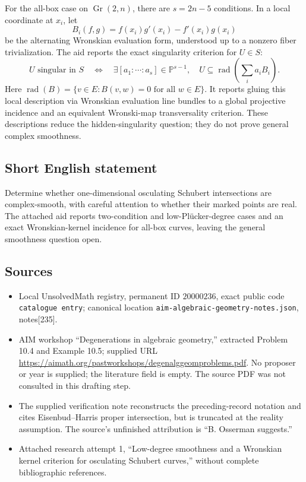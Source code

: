 \documentclass[11pt]{article}
\newcommand{\PP}{\mathbb{P}}
\begin{document}
For the all-box case on \(\operatorname{Gr}(2,n)\), there are \(s=2n-5\) conditions. In a local coordinate at \(x_i\), let
\[
B_i(f,g)=f(x_i)g'(x_i)-f'(x_i)g(x_i)
\]
be the alternating Wronskian evaluation form, understood up to a nonzero fiber trivialization. The aid reports the exact singularity criterion for \(U\in S\):
\[
U\text{ singular in }S
\quad\Longleftrightarrow\quad
\exists[a_1:\cdots:a_s]\in\PP^{s-1},\quad
U\subseteq\operatorname{rad}\!\left(\sum_i a_iB_i\right).
\]
Here \(\operatorname{rad}(B)=\{v\in E:B(v,w)=0\text{ for all }w\in E\}\). It reports gluing this local description via Wronskian evaluation line bundles to a global projective incidence and an equivalent Wronski-map transversality criterion. These descriptions reduce the hidden-singularity question; they do not prove general complex smoothness.
\subsection{Short English statement}
Determine whether one-dimensional osculating Schubert intersections are complex-smooth, with careful attention to whether their marked points are real. The attached aid reports two-condition and low-Pl\"ucker-degree cases and an exact Wronskian-kernel incidence for all-box curves, leaving the general smoothness question open.
\subsection{Sources}
\begin{itemize}
\item Local UnsolvedMath registry, permanent ID \(20000236\), exact public code \texttt{catalogue entry}; canonical location \texttt{aim-algebraic-geometry-notes.json}, notes[235].
\item AIM workshop ``Degenerations in algebraic geometry,'' extracted Problem 10.4 and Example 10.5; supplied URL \url{https://aimath.org/pastworkshops/degenalggeomproblems.pdf}. No proposer or year is supplied; the literature field is empty. The source PDF was not consulted in this drafting step.
\item The supplied verification note reconstructs the preceding-record notation and cites Eisenbud--Harris proper intersection, but is truncated at the reality assumption. The source's unfinished attribution is ``B. Osserman suggests.''
\item Attached research attempt 1, ``Low-degree smoothness and a Wronskian kernel criterion for osculating Schubert curves,'' without complete bibliographic references.
\end{itemize}
\end{document}
